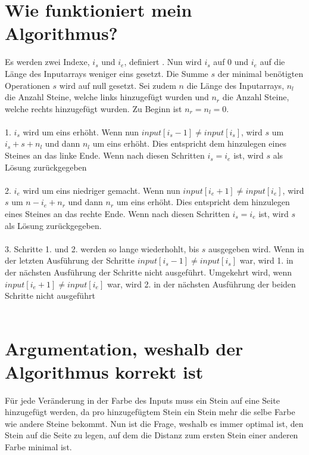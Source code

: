 \documentclass[12pt]{article}
\begin{document}
	\maketitle
\newpage
	\section{Wie funktioniert mein Algorithmus?}
	Es werden zwei Indexe, $i_s$ und $i_e$, definiert .  Nun wird $i_s$ auf 0 und $i_e$ auf die Länge des Inputarrays weniger eins gesetzt. Die Summe $s$ der minimal benötigten Operationen $s$ wird auf null gesetzt. Sei zudem $n$ die Länge des Inputarrays, $n_l$ die Anzahl Steine, welche links hinzugefügt wurden und $n_r$ die Anzahl Steine, welche rechts hinzugefügt wurden. Zu Beginn ist $n_r = n_l = 0$.
	\\\\
	1. $i_s$  wird um eins erhöht. Wenn nun $input[i_s - 1] \neq input[i_s]$, wird $s$ um $i_s + s + n_l$ und dann $n_l$ um eins erhöht.  Dies entspricht dem hinzulegen eines Steines an das linke Ende. Wenn nach diesen Schritten $i_s = i_e$ ist, wird $s$ als Lösung zurückgegeben\\\\
	2. $i_e$  wird um eins niedriger gemacht. Wenn nun $input[i_e + 1] \neq input[i_e]$, wird $s$ um $n - i_e + n_r$ und dann $n_r$ um eins erhöht. Dies entspricht dem hinzulegen eines Steines an das rechte Ende. Wenn nach diesen Schritten $i_s = i_e$ ist, wird $s$ als Lösung zurückgegeben.\\\\
	3. Schritte 1. und 2. werden so lange wiederhohlt, bis $s$ ausgegeben wird.  Wenn in der letzten Ausführung der Schritte $input[i_s - 1] \neq input[i_s]$ war, wird 1. in der nächsten Ausführung der Schritte nicht ausgeführt. Umgekehrt wird, wenn $input[i_e + 1] \neq input[i_e]$ war, wird 2. in der nächsten Ausführung der beiden Schritte nicht ausgeführt\\\\
	
	\section{Argumentation, weshalb der Algorithmus korrekt ist}
	Für jede Veränderung in der Farbe des Inputs muss ein Stein auf eine Seite hinzugefügt werden, da pro hinzugefügtem Stein  ein Stein mehr die selbe Farbe wie andere Steine bekommt. Nun ist die Frage, weshalb es immer optimal ist, den Stein auf die Seite zu legen, auf dem die Distanz zum ersten Stein einer anderen Farbe minimal ist. 
\end{document}
